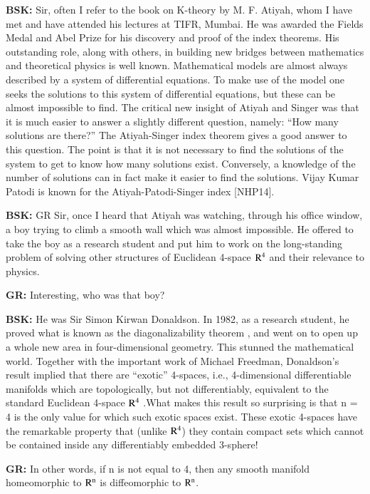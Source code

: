 \textbf{BSK:} Sir, often I refer to the book on K-theory by M. F. Atiyah, whom I have met  and have attended his lectures at TIFR, Mumbai. He was awarded the Fields Medal and Abel Prize for his discovery and proof of the index theorems. His outstanding role, along with others, in building new bridges between mathematics and theoretical physics is well known. Mathematical models are almost always described by a system of differential equations. To make use of the model one seeks the solutions to this system of differential equations, but these can be almost impossible to find. The critical new insight of Atiyah and Singer was that it is much easier to answer a slightly different question, namely: “How many solutions are there?” The Atiyah-Singer index theorem gives a good answer to this question. The point is that it is not necessary to find the solutions of the system to get to know how many solutions exist. Conversely, a knowledge of the number of solutions can in fact make it easier to find the solutions. Vijay Kumar Patodi is known for the Atiyah-Patodi-Singer index [NHP14].

\textbf{BSK:} GR Sir, once I heard that Atiyah was watching, through his office window, a boy trying to climb a smooth wall which was almost impossible. He offered to take the boy as a research student and put him to work on the long-standing problem of solving other structures of Euclidean 4-space ${\rm R}^{4}$ and their relevance to physics.

\textbf{GR:} Interesting, who was that boy?

\textbf{BSK:} He was Sir Simon Kirwan Donaldson. In 1982, as a research student, he proved what is known as the diagonalizability theorem \cite{chap17-key08SD}, and went on to open up a whole new area in four-dimensional geometry. This stunned the mathematical world. Together with the important work of Michael Freedman, Donaldson's result implied that there are “exotic” 4-spaces, i.e., 4-dimensional differentiable manifolds which are topologically, but not differentiably, equivalent to the standard Euclidean 4-space  ${\rm R}^{4}$ .What makes this result so surprising is that n = 4 is the only value for which such exotic spaces exist. These exotic 4-spaces have the remarkable property that (unlike ${\rm R}^{4}$) they contain compact sets which cannot be contained inside any differentiably embedded 3-sphere!
\vskip 1pt

\textbf{GR:} In other words, if n is not equal to 4, then any smooth manifold homeomorphic to ${\rm R}^{\rm n}$ is diffeomorphic to ${\rm R}^{\rm n}$.
\vskip 1pt

